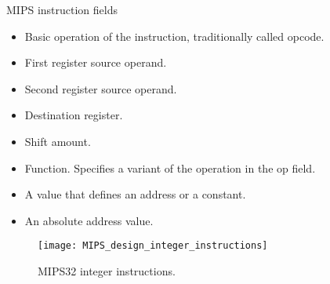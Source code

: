 \documentclass[]{slides}
\begin{document}
% 
\begin{frame}{\ac{MIPS} instruction fields}
  \begin{itemize}
  \item {} Basic operation of the instruction, traditionally called \alert{opcode}.
  \item {} First register source operand.
  \item {} Second register source operand.
  \item {} Destination register.
  \item {} Shift amount.
  \item {} Function. Specifies a variant of the operation in the op field.
  \item {} A value that defines an address or a constant.
  \item {} An absolute address value.
  \end{itemize}
\end{frame}

% 
\begin{frame}{}
  \begin{figure}
  \centering
  \texttt{[image: MIPS\_design\_integer\_instructions]}
  \vspace{-8pt}
  \caption{\acs{MIPS}32 integer instructions.}
  \label{Figure:MIPS32_integer_instructions}
  \end{figure}
\end{frame}
\end{document}

